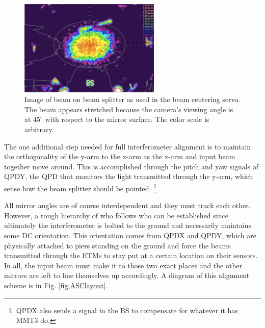 \begin{figure} 
\begin{centering} \includegraphics[width=0.6\textwidth]{figures/BCSspiricon.pdf} 
\caption{Image of beam on beam splitter as used in the beam centering servo. The beam appears stretched because the camera's viewing angle is at $45^{\circ}$ with respect to the mirror surface. The color scale is arbitrary.}
\label{fig:BCS}
\end{centering}
\end{figure}

The one additional step needed for full interferometer alignment is to maintain the orthogonality of the y-arm to the x-arm as the x-arm and input beam together move around. This is accomplished through the pitch and yaw signals of QPDY, the QPD that monitors the light transmitted through the y-arm, which sense how the beam splitter should be pointed. \footnote{QPDX also sends a signal to the BS to compensate for whatever it has MMT3 do.}

All mirror angles are of course interdependent and they must track each other. However, a rough hierarchy of who follows who can be established since ultimately the interferometer is bolted to the ground and necessarily maintains some DC orientation. This orientation comes from QPDX and QPDY, which are physically attached to piers standing on the ground and force the beams transmitted through the ETMs to stay put at a certain location on their sensors. In all, the input beam must make it to those two exact places and the other mirrors are left to line themselves up accordingly. A diagram of this alignment scheme is in Fig. \ref{fig:ASClayout}.


